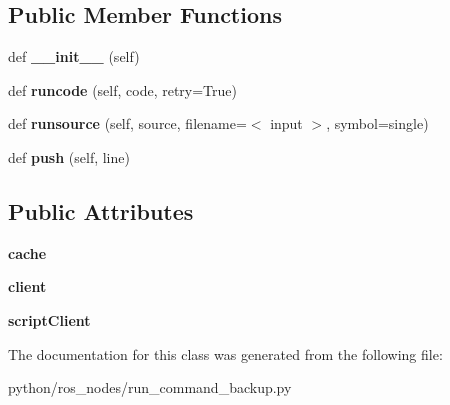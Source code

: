 \subsection*{Public Member Functions}
\begin{DoxyCompactItemize}
\item 
def {\bfseries \+\_\+\+\_\+init\+\_\+\+\_\+} (self)\hypertarget{classros__nodes_1_1run__command__backup_1_1RosShell_aa3798996f563a9c52a566db1c034cb6c}{}\label{classros__nodes_1_1run__command__backup_1_1RosShell_aa3798996f563a9c52a566db1c034cb6c}

\item 
def {\bfseries runcode} (self, code, retry=True)\hypertarget{classros__nodes_1_1run__command__backup_1_1RosShell_a5655d03fa526e8897ed6084e55004a6e}{}\label{classros__nodes_1_1run__command__backup_1_1RosShell_a5655d03fa526e8897ed6084e55004a6e}

\item 
def {\bfseries runsource} (self, source, filename=\textquotesingle{}$<$ input $>$\textquotesingle{}, symbol=\textquotesingle{}single\textquotesingle{})\hypertarget{classros__nodes_1_1run__command__backup_1_1RosShell_a468e426edcb769c82a4af55a130cdd03}{}\label{classros__nodes_1_1run__command__backup_1_1RosShell_a468e426edcb769c82a4af55a130cdd03}

\item 
def {\bfseries push} (self, line)\hypertarget{classros__nodes_1_1run__command__backup_1_1RosShell_a2ada9fcfb46c0adab2f7e85a3ef90cc4}{}\label{classros__nodes_1_1run__command__backup_1_1RosShell_a2ada9fcfb46c0adab2f7e85a3ef90cc4}

\end{DoxyCompactItemize}
\subsection*{Public Attributes}
\begin{DoxyCompactItemize}
\item 
{\bfseries cache}\hypertarget{classros__nodes_1_1run__command__backup_1_1RosShell_a5438a181865ed3ce12c395cab5cad82a}{}\label{classros__nodes_1_1run__command__backup_1_1RosShell_a5438a181865ed3ce12c395cab5cad82a}

\item 
{\bfseries client}\hypertarget{classros__nodes_1_1run__command__backup_1_1RosShell_ae25ecb8812ff84cc7d60cd6c16b3b7b8}{}\label{classros__nodes_1_1run__command__backup_1_1RosShell_ae25ecb8812ff84cc7d60cd6c16b3b7b8}

\item 
{\bfseries script\+Client}\hypertarget{classros__nodes_1_1run__command__backup_1_1RosShell_ac9bc0a16d5819d4d244b7fc54796b0a2}{}\label{classros__nodes_1_1run__command__backup_1_1RosShell_ac9bc0a16d5819d4d244b7fc54796b0a2}

\end{DoxyCompactItemize}


The documentation for this class was generated from the following file\+:\begin{DoxyCompactItemize}
\item 
python/ros\+\_\+nodes/run\+\_\+command\+\_\+backup.\+py\end{DoxyCompactItemize}
